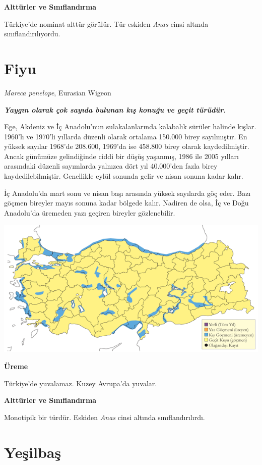 \documentclass[
  a4paper,
  DIV=11,
  numbers=noendperiod]{scrreprt}
\begin{document}
\textbf{Alttürler ve Sınıflandırma}

Türkiye'de nominat alttür görülür. Tür eskiden \emph{Anas} cinsi altında
sınıflandırılıyordu.

\section{Fiyu}\label{fiyu}

\emph{Mareca penelope}, Eurasian Wigeon

\textbf{\emph{Yaygın olarak çok sayıda bulunan kış konuğu ve geçit
türüdür.}}

Ege, Akdeniz ve İç Anadolu'nun sulakalanlarında kalabalık sürüler
halinde kışlar. 1960'lı ve 1970'li yıllarda düzenli olarak ortalama
150.000 birey sayılmıştır. En yüksek sayılar 1968'de 208.600, 1969'da
ise 458.800 birey olarak kaydedilmiştir. Ancak günümüze gelindiğinde
ciddi bir düşüş yaşanmış, 1986 ile 2005 yılları arasındaki düzenli
sayımlarda yalnızca dört yıl 40.000'den fazla birey kaydedilebilmiştir.
Genellikle eylül sonunda gelir ve nisan sonuna kadar kalır.

İç Anadolu'da mart sonu ve nisan başı arasında yüksek sayılarda göç
eder. Bazı göçmen bireyler mayıs sonuna kadar bölgede kalır. Nadiren de
olsa, İç ve Doğu Anadolu'da üremeden yazı geçiren bireyler gözlenebilir.

\includegraphics{images/harita_Page_015.png}

\textbf{Üreme}

Türkiye'de yuvalamaz. Kuzey Avrupa'da yuvalar.

\textbf{Alttürler ve Sınıflandırma}

Monotipik bir türdür. Eskiden \emph{Anas} cinsi altında
sınıflandırılırdı.

\section{Yeşilbaş}\label{yeux15filbaux15f}
\end{document}
